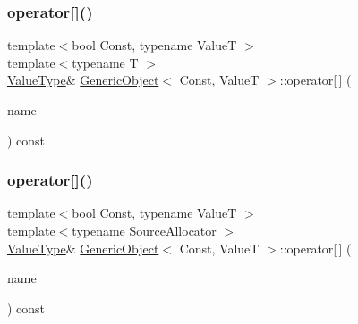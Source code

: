 \subsubsection{\texorpdfstring{operator[]()}{operator[]()}\hspace{0.1cm}{\footnotesize\ttfamily [1/2]}}
{\footnotesize\ttfamily template$<$bool Const, typename ValueT $>$ \\
template$<$typename T $>$ \\
\hyperlink{classGenericObject_a930aa30f89caee7ba7bff60bf9dc21b1}{Value\+Type}\& \hyperlink{classGenericObject}{Generic\+Object}$<$ Const, ValueT $>$\+::operator\mbox{[}$\,$\mbox{]} (\begin{DoxyParamCaption}\item[{T $\ast$}]{name }\end{DoxyParamCaption}) const\hspace{0.3cm}{\ttfamily [inline]}}

\mbox{\label{classGenericObject_a19bfc1bd98b120d42e7d50db0886614a}} 
\subsubsection{\texorpdfstring{operator[]()}{operator[]()}\hspace{0.1cm}{\footnotesize\ttfamily [2/2]}}
{\footnotesize\ttfamily template$<$bool Const, typename ValueT $>$ \\
template$<$typename Source\+Allocator $>$ \\
\hyperlink{classGenericObject_a930aa30f89caee7ba7bff60bf9dc21b1}{Value\+Type}\& \hyperlink{classGenericObject}{Generic\+Object}$<$ Const, ValueT $>$\+::operator\mbox{[}$\,$\mbox{]} (\begin{DoxyParamCaption}\item[{\hyperlink{classGenericObject_af70c9646b5e422306c33e98b3d8783a7}{const} \hyperlink{classGenericValue}{Generic\+Value}$<$ \hyperlink{classGenericObject_a96ebfdde095e2ce42535d15ae5dc58ef}{Encoding\+Type}, Source\+Allocator $>$ \&}]{name }\end{DoxyParamCaption}) const\hspace{0.3cm}{\ttfamily [inline]}}

\mbox{\label{classGenericObject_a98ebcec632c41442d89cd8634b7ecc47}} 
